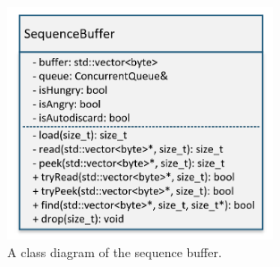\begin{figure}[ht]
\centering
      \includegraphics[width=0.7\textwidth]{seqbuf}
        \caption{A class diagram of the sequence buffer.}
\end{figure}

